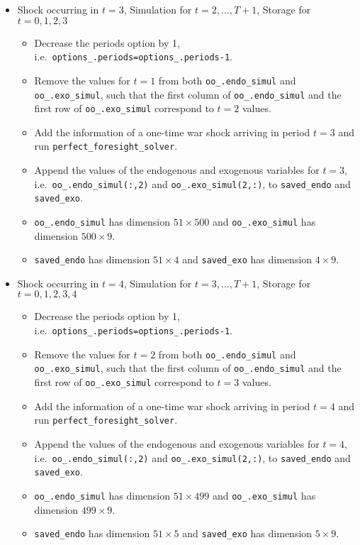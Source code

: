 \documentclass{article}
\begin{document}
\begin{enumerate}
\begin{itemize}
    \item Shock occurring in $t=3$, Simulation for $t=2,...,T+1$, Storage for $t=0,1,2,3$
    \begin{itemize}
      \item Decrease the periods option by 1, i.e.\ \texttt{options\_.periods=options\_.periods-1}.
      \item Remove the values for $t=1$ from both \texttt{oo\_.endo\_simul} and \texttt{oo\_.exo\_simul},
      such that the first column of \texttt{oo\_.endo\_simul} and the first row of \texttt{oo\_.exo\_simul} correspond to $t=2$ values.
      \item Add the information of a one-time war shock arriving in period $t=3$ and run \texttt{perfect\_foresight\_solver}.
      \item Append the values of the endogenous and exogenous variables for $t=3$,\\
        i.e.\ \texttt{oo\_.endo\_simul(:,2)} and \texttt{oo\_.exo\_simul(2,:)},
        to \texttt{saved\_endo} and \texttt{saved\_exo}.
      \item \texttt{oo\_.endo\_simul} has dimension $51 \times 500$ and \texttt{oo\_.exo\_simul} has dimension $500 \times 9$.
      \item \texttt{saved\_endo} has dimension $51 \times 4$ and \texttt{saved\_exo} has dimension $4 \times 9$.
    \end{itemize}

    \item Shock occurring in $t=4$, Simulation for $t=3,...,T+1$, Storage for $t=0,1,2,3,4$
    \begin{itemize}
      \item Decrease the periods option by 1, i.e.\ \texttt{options\_.periods=options\_.periods-1}.
      \item Remove the values for $t=2$ from both \texttt{oo\_.endo\_simul} and \texttt{oo\_.exo\_simul},
      such that the first column of \texttt{oo\_.endo\_simul} and the first row of \texttt{oo\_.exo\_simul} correspond to $t=3$ values.
      \item Add the information of a one-time war shock arriving in period $t=4$ and run \texttt{perfect\_foresight\_solver}.
      \item Append the values of the endogenous and exogenous variables for $t=4$,\\
        i.e.\ \texttt{oo\_.endo\_simul(:,2)} and \texttt{oo\_.exo\_simul(2,:)},
        to \texttt{saved\_endo} and \texttt{saved\_exo}.
      \item \texttt{oo\_.endo\_simul} has dimension $51 \times 499$ and \texttt{oo\_.exo\_simul} has dimension $499 \times 9$.
      \item \texttt{saved\_endo} has dimension $51 \times 5$ and \texttt{saved\_exo} has dimension $5 \times 9$.
    \end{itemize}


\end{itemize}
\end{enumerate}
\end{document}
